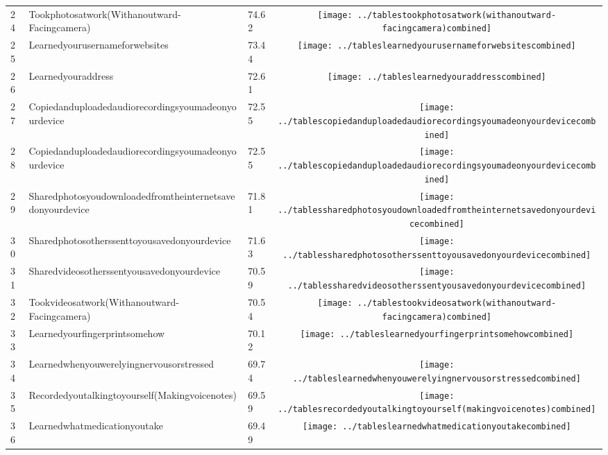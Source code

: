 \documentclass[a4paper,12pt]{article}
\begin{document}
\begin{longtable}{| p{0.5cm} | p{7cm} | p{1cm} | c |}
24 & Tookphotosatwork(Withanoutward-Facingcamera) & 74.62 & \texttt{[image: ../tablestookphotosatwork(withanoutward-facingcamera)combined]} \\ 
25 & Learnedyourusernameforwebsites & 73.44 & \texttt{[image: ../tableslearnedyourusernameforwebsitescombined]} \\ 
26 & Learnedyouraddress & 72.61 & \texttt{[image: ../tableslearnedyouraddresscombined]} \\ 
27 & Copiedanduploadedaudiorecordingsyoumadeonyourdevice & 72.55 & \texttt{[image: ../tablescopiedanduploadedaudiorecordingsyoumadeonyourdevicecombined]} \\ 
28 & Copiedanduploadedaudiorecordingsyoumadeonyourdevice & 72.55 & \texttt{[image: ../tablescopiedanduploadedaudiorecordingsyoumadeonyourdevicecombined]} \\ 
29 & Sharedphotosyoudownloadedfromtheinternetsavedonyourdevice & 71.81 & \texttt{[image: ../tablessharedphotosyoudownloadedfromtheinternetsavedonyourdevicecombined]} \\ 
30 & Sharedphotosotherssenttoyousavedonyourdevice & 71.63 & \texttt{[image: ../tablessharedphotosotherssenttoyousavedonyourdevicecombined]} \\ 
31 & Sharedvideosotherssentyousavedonyourdevice & 70.59 & \texttt{[image: ../tablessharedvideosotherssentyousavedonyourdevicecombined]} \\ 
32 & Tookvideosatwork(Withanoutward-Facingcamera) & 70.54 & \texttt{[image: ../tablestookvideosatwork(withanoutward-facingcamera)combined]} \\ 
33 & Learnedyourfingerprintsomehow & 70.12 & \texttt{[image: ../tableslearnedyourfingerprintsomehowcombined]} \\ 
34 & Learnedwhenyouwerelyingnervousorstressed & 69.74 & \texttt{[image: ../tableslearnedwhenyouwerelyingnervousorstressedcombined]} \\ 
35 & Recordedyoutalkingtoyourself(Makingvoicenotes) & 69.59 & \texttt{[image: ../tablesrecordedyoutalkingtoyourself(makingvoicenotes)combined]} \\ 
36 & Learnedwhatmedicationyoutake & 69.49 & \texttt{[image: ../tableslearnedwhatmedicationyoutakecombined]} \\ 

\end{longtable}
\end{document}
